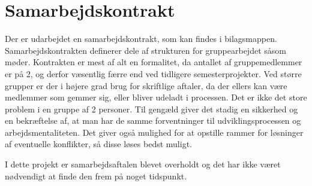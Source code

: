 \chapter{Samarbejdskontrakt}
Der er udarbejdet en samarbejdskontrakt, som kan findes i bilagsmappen. Samarbejdskontrakten definerer dele af strukturen for gruppearbejdet såsom møder. Kontrakten er mest af alt en formalitet, da antallet af gruppemedlemmer er på 2, og derfor væsentlig færre end ved tidligere semesterprojekter. Ved større grupper er der i højere grad brug for skriftlige aftaler, da der ellers kan være medlemmer som gemmer sig, eller bliver udeladt i processen. Det er ikke det store problem i en gruppe af 2 personer. Til gengæld giver det stadig en sikkerhed og en bekræftelse af, at man har de samme forventninger til udviklingsprocessen og arbejdsmentaliteten. Det giver også mulighed for at opstille rammer for løsninger af eventuelle konflikter, så disse løses bedst muligt. 

I dette projekt er samarbejdsaftalen blevet overholdt og det har ikke været nødvendigt at finde den frem på noget tidspunkt.  